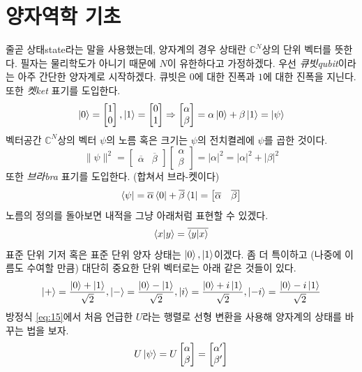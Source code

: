 \documentclass[a4paper,chapter,atbegshi]{oblivoir}
\begin{document}
\chapter{양자역학 기초}
줄곧 상태{\tiny state}라는 말을 사용했는데, 양자계의 경우 상태란 
$\mathbb{C}^N$상의 단위 벡터를 뜻한다. 필자는 물리학도가 아니기 때문에 $N$이
유한하다고 가정하겠다. 우선 \emph{큐빗\tiny qubit}이라는 아주 간단한
양자계로 시작하겠다. 큐빗은 $0$에 대한 진폭과 $1$에 대한 진폭을 지닌다. 또한
\emph{켓\tiny ket} 표기를 도입한다.
\[
  \ket{0}=\begin{bmatrix}1\\0\end{bmatrix},\ket{1}=\begin{bmatrix}0\\1\end{bmatrix} 
  \Rightarrow\begin{bmatrix}\alpha\\\beta\end{bmatrix}=
  \alpha\ket{0}+\beta\ket{1}=\ket{\psi}
\]
벡터공간 $\mathbb{C}^N$상의 벡터 $\psi$의 노름 혹은 크기는 $\psi$의 전치켤레에 $\psi$를
곱한 것이다.
\[
  \|\psi\|^2 = \begin{bmatrix}\overline{\alpha}&\overline{\beta}\end{bmatrix}
  \begin{bmatrix}\alpha\\\beta\end{bmatrix} = |\alpha|^2 = |\alpha|^2 + |\beta|^2
\]
또한 \emph{브라\tiny bra} 표기를 도입한다. (합쳐서 브라-켓이다)
\[
  \bra{\psi} = \overline{\alpha}\bra{0}+\overline{\beta}\bra{1}
  =\begin{bmatrix}\overline{\alpha}&\overline{\beta}\end{bmatrix}
\]
노름의 정의를 돌아보면 내적을 그냥 아래처럼 표현할 수 있겠다.
\[
  \braket{x|y}=\overline{\braket{y|x}}
\]
표준 단위 기저 혹은 표준 단위 양자 상태는 $\ket{0},\ket{1}$이겠다. 
좀 더 특이하고 (나중에 이름도 수여할 만큼) 대단히 중요한 단위 벡터로는 아래
같은 것들이 있다.
\[
  \ket{+}=\frac{\ket0+\ket1}{\sqrt{2}}, \ket{-}=\frac{\ket{0}-\ket{1}}{\sqrt{2}},
  \ket{i}=\frac{\ket0+i\ket1}{\sqrt{2}}, \ket{-i}=\frac{\ket0-i\ket1}{\sqrt2}
\]
방정식 \ref{eq:15}에서 처음 언급한 $U$라는 행렬로 선형 변환을 사용해 양자계의
상태를 바꾸는 법을 보자.
\[
  U\ket{\psi} = U\begin{bmatrix}\alpha\\\beta\end{bmatrix}
  =\begin{bmatrix}\alpha'\\\beta'\end{bmatrix}
\]
\end{document}
